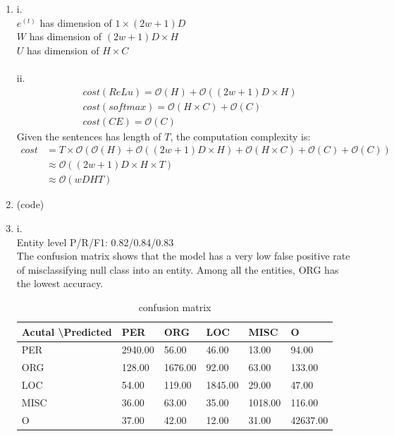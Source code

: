 \documentclass[10pt]{article}
\begin{document}
\begin{enumerate}[label=(\alph*)]
\item
i.\\
$e^{(t)}$ has dimension of $1 \times (2w+1)D$\\
$W$ has dimension of $(2w+1)D \times H$\\
$U$ has dimension of $H \times C$\\
\\
ii.\\
$$
\begin{aligned}
& cost(ReLu) = \mathcal{O}(H) + \mathcal{O}((2w+1)D \times H)\\
& cost(softmax) = \mathcal{O}(H \times C) + \mathcal{O}(C)\\
& cost(CE) = \mathcal{O}(C)
\end{aligned}
$$
Given the sentences has length of $T$, the computation complexity is:
$$
\begin{aligned}
cost
& = T \times \mathcal{O}(\mathcal{O}(H) + \mathcal{O}((2w+1)D \times H) + \mathcal{O}(H \times C) + \mathcal{O}(C) + \mathcal{O}(C))\\
& \approx \mathcal{O}((2w+1)D \times H \times T)\\
& \approx \mathcal{O}(wDHT)
\end{aligned}
$$

\item
(code)

\item
i.\\
Entity level P/R/F1: 0.82/0.84/0.83\\
The confusion matrix shows that the model has a very low false positive rate of misclassifying null class into an entity. Among all the entities,  ORG has the lowest accuracy.
\begin{table}[h]
	\centering
	\caption{confusion matrix}
	\begin{tabular}{|l|l|l|l|l|l|}
	\hline
	Acutal \textbackslash Predicted & PER     & ORG     & LOC     & MISC    & O        \\ \hline
	PER   & 2940.00 & 56.00   & 46.00   & 13.00   & 94.00    \\ \hline
	ORG   & 128.00  & 1676.00 & 92.00   & 63.00   & 133.00   \\ \hline
	LOC   & 54.00   & 119.00  & 1845.00 & 29.00   & 47.00    \\ \hline
	MISC  & 36.00   & 63.00   & 35.00   & 1018.00 & 116.00   \\ \hline
	O     & 37.00   & 42.00   & 12.00   & 31.00   & 42637.00 \\ \hline
	\end{tabular}
\end{table}


\end{enumerate}
\end{document}
